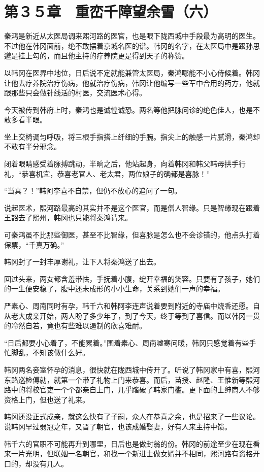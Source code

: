 \section{第３５章　重峦千障望余雪（六）}

秦鸿是新近从太医局调来熙河路的医官，也是眼下陇西城中手段最为高明的医生。不过他在韩冈面前，绝不敢摆着京城名医的谱。韩冈的名字，在太医局中是跟孙思邈是挂上勾的，而且他主持的疗养院更是得到天子的称赞。

以韩冈在医界中地位，日后说不定就能兼管太医局，秦鸿哪能不小心侍候着。韩冈让他去疗养院治疗伤病，他就治疗伤病，韩冈让他编写一些军中合用的药方，他就跟那些只会做针线活的村医，交流医术心得。

今天被传到韩府上时，秦鸿也是诚惶诚恐。两名等他把脉问诊的绝色佳人，也是不敢多看半眼。

坐上交椅调匀呼吸，将三根手指搭上纤细的手腕。指尖上的触感一片腻滑，秦鸿却不敢有半分邪念。

闭着眼睛感受着脉搏跳动，半晌之后，他站起身，向着韩冈和韩父韩母拱手行礼，“恭喜机宜，恭喜老官人、老太君，两位娘子的确都是喜脉！”

“当真？！”韩阿李喜不自禁，但仍不放心的追问了一句。

说起医术，熙河路最高的其实并不是这个医官，而是僧人智缘。只是智缘现在跟着王韶去了熙州，韩冈也只能将秦鸿请来。

可秦鸿虽不比那些御医，甚至不比智缘，但喜脉是怎么也不会诊错的，他点头打着保票，“千真万确。”

韩冈封了一封丰厚谢礼，让下人将秦鸿送了出去。

回过头来，两女都含羞带怯，手抚着小腹，绽开幸福的笑容。只要有了孩子，她们的一生便安稳了，腹中还未成形的小小生命，关系到她们一声的幸福。

严素心、周南同时有孕，韩千六和韩阿李连声说着要到附近的寺庙中烧香还愿。自从老大成亲开始，两人盼了多少年了，到了今天，终于等到了喜信。而以韩冈一贯的冷然自若，竟也有些难以遏制的欣喜难耐。

“日后都要小心着了，不能累着。”围着素心、周南嘘寒问暖，韩冈只感觉着有些手忙脚乱，不知该做什么好。

韩冈两名妾室怀孕的消息，很快就在陇西城中传开了。听说了韩冈家中有喜，熙河东路巡检傅勍，就第一个带了礼物上门来恭喜。而后，苗授、赵隆、王惟新等熙河路中的将校官吏一个个都亲自上门，几乎踏破了韩家门槛。更下面的士绅商人不够资格上门，但也送了礼来。

韩冈还没正式成亲，就这么快有了子嗣，众人在恭喜之余，也是招来了一些议论。说韩冈早过弱冠之年，又晋了朝官，也该成婚娶妻，好有人来主持中馈。

韩千六的官职不可能再升到哪里，日后也是做封翁的份。韩冈的前途至少在现在看来一片光明，但联姻一名朝官，和找一个新进士做女婿并不相同，熙河路有资格开口的，却没有几人。

